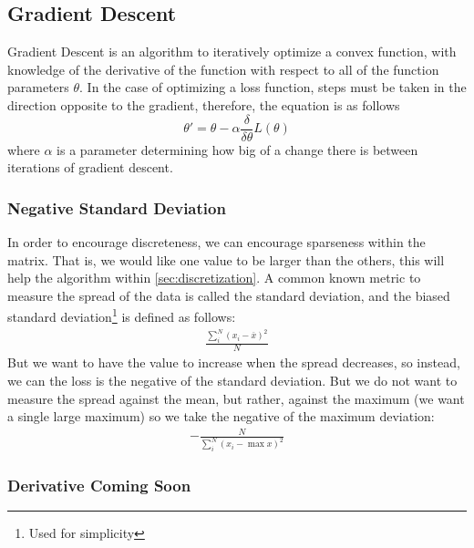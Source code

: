 \subsection{Gradient Descent}%
\label{sub:gradient_descent}
Gradient Descent is an algorithm to iteratively optimize a convex function, with knowledge of the derivative of the function with respect to all of the function parameters $\theta$. In the case of optimizing a loss function, steps must be taken in the direction opposite to the gradient, therefore, the equation is as follows
\begin{equation}
         \theta'=\theta-\alpha \frac{\delta}{\delta \theta}L(\theta)
\end{equation}
where $\alpha$ is a parameter determining how big of a change there is between iterations of gradient descent.

\subsubsection{Negative Standard Deviation}%
\label{ssub:negative_standard_deviation}
In order to encourage discreteness, we can encourage sparseness within the matrix. That is, we would like one value to be larger than the others, this will help the algorithm within \ref{sec:discretization}. A common known metric to measure the spread of the data is called the standard deviation, and the biased standard deviation\footnote{Used for simplicity} is defined as follows:
\begin{align*}
    \frac{\sum_i^N \left(x_i-\overline{x}\right)^2}{N}
\end{align*}
But we want to have the value to increase when the spread decreases, so instead, we can the loss is the negative of the standard deviation. But we do not want to measure the spread against the mean, but rather, against the maximum (we want a single large maximum) so we take the negative of the maximum deviation:
\begin{align*}
    -\frac{N}{\sum_i^N \left(x_i-\max{x}\right)^2}
\end{align*}

\subsubsection{Derivative Coming Soon}%
\label{ssub:derivative_coming_soon}

